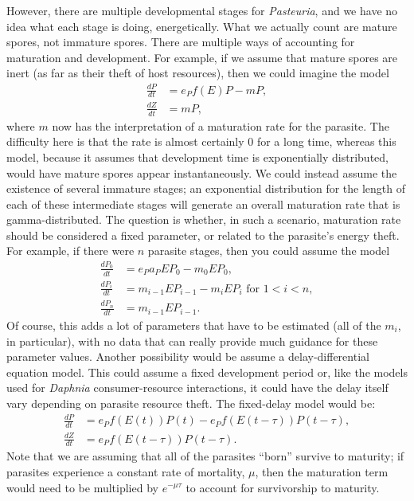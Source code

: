 \documentclass[12pt,reqno,final,pdftex]{amsart}\usepackage[]{graphicx}\usepackage[]{color}
\theoremstyle{plain}
\numberwithin{equation}{part}
\begin{document}
However, there are multiple developmental stages for \emph{Pasteuria}, and we have no idea what each stage is doing, energetically.
What we actually count are mature spores, not immature spores.
There are multiple ways of accounting for maturation and development.
For example, if we assume that mature spores are inert (as far as their theft of host resources), then we could imagine the model
\begin{align}
\frac{dP}{dt} &= e_P f(E) P - m P, \\
\frac{dZ}{dt} &= m P,
\end{align}
where $m$ now has the interpretation of a maturation rate for the parasite.
The difficulty here is that the rate is almost certainly 0 for a long time, whereas this model, because it assumes that development time is exponentially distributed, would have mature spores appear instantaneously.
We could instead assume the existence of several immature stages; an exponential distribution for the length of each of these intermediate stages will generate an overall maturation rate that is gamma-distributed.
The question is whether, in such a scenario, maturation rate should be considered a fixed parameter, or related to the parasite's energy theft.
For example, if there were $n$ parasite stages, then you could assume the model
\begin{align}
\frac{dP_0}{dt} &= e_P a_P E P_0 - m_0 E P_0, \\
\frac{dP_i}{dt} &= m_{i-1} E P_{i-1} - m_i E P_i \text{ for $1 < i < n$},  \\
\frac{dP_n}{dt} &= m_{i-1} E P_{i-1}.
\end{align}
Of course, this adds a lot of parameters that have to be estimated (all of the $m_i$, in particular), with no data that can really provide much guidance for these parameter values.
Another possibility would be assume a delay-differential equation model.
This could assume a fixed development period or, like the models used for \emph{Daphnia} consumer-resource interactions, it could have the delay itself vary depending on parasite resource theft.
The fixed-delay model would be:
\begin{align}
\frac{dP}{dt} &= e_P f(E(t)) P(t) - e_P f(E(t-\tau)) P(t-\tau), \\
\frac{dZ}{dt} &= e_P f(E(t-\tau)) P(t-\tau).
\end{align}
Note that we are assuming that all of the parasites ``born'' survive to maturity; if parasites experience a constant rate of mortality, $\mu$, then the maturation term would need to be multiplied by $e^{-\mu \tau}$ to account for survivorship to maturity.
\end{document}
